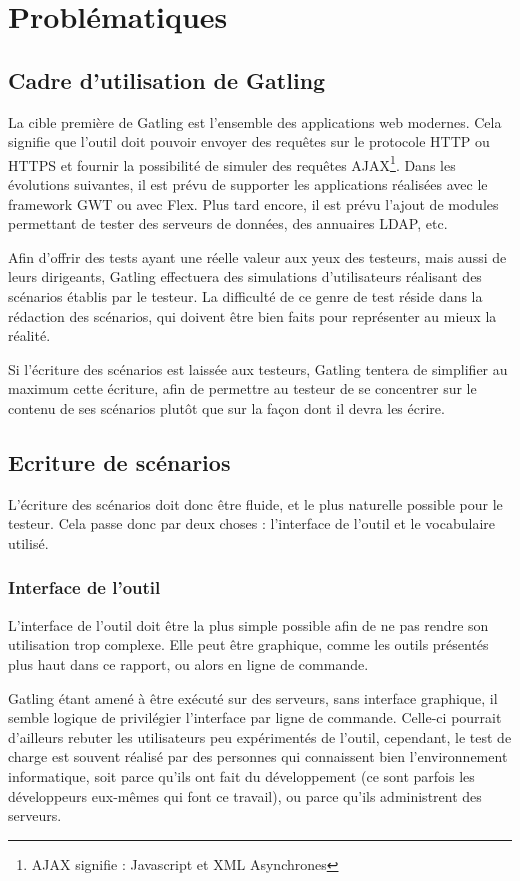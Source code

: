 \chapter{Problématiques}
\section{Cadre d'utilisation de Gatling}
La cible première de Gatling est l'ensemble des applications web modernes. Cela signifie que l'outil doit pouvoir envoyer des requêtes sur le protocole HTTP ou HTTPS et fournir la possibilité de simuler des requêtes AJAX\footnote{AJAX signifie  : Javascript et XML Asynchrones}. Dans les évolutions suivantes, il est prévu de supporter les applications réalisées avec le framework GWT ou avec Flex. Plus tard encore, il est prévu l'ajout de modules permettant de tester des serveurs de données, des annuaires LDAP, etc.

Afin d'offrir des tests ayant une réelle valeur aux yeux des testeurs, mais aussi de leurs dirigeants, Gatling effectuera des simulations d'utilisateurs réalisant des scénarios établis par le testeur. La difficulté de ce genre de test réside dans la rédaction des scénarios, qui doivent être bien faits pour représenter au mieux la réalité.

Si l'écriture des scénarios est laissée aux testeurs, Gatling tentera de simplifier au maximum cette écriture, afin de permettre au testeur de se concentrer sur le contenu de ses scénarios plutôt que sur la façon dont il devra les écrire. 

\section{Ecriture de scénarios}
L'écriture des scénarios doit donc être fluide, et le plus naturelle possible pour le testeur. Cela passe donc par deux choses : l'interface de l'outil et le vocabulaire utilisé.

\subsection{Interface de l'outil}
L'interface de l'outil doit être la plus simple possible afin de ne pas rendre son utilisation trop complexe. Elle peut être graphique, comme les outils présentés plus haut dans ce rapport, ou alors en ligne de commande. 

Gatling étant amené à être exécuté sur des serveurs, sans interface graphique, il semble logique de privilégier l'interface par ligne de commande. Celle-ci pourrait d'ailleurs rebuter les utilisateurs peu expérimentés de l'outil, cependant, le test de charge est souvent réalisé par des personnes qui connaissent bien l'environnement informatique, soit parce qu'ils ont fait du développement (ce sont parfois les développeurs eux-mêmes qui font ce travail), ou parce qu'ils administrent des serveurs.

